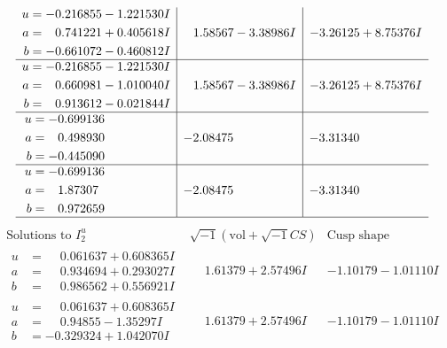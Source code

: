 \documentclass[1p]{elsarticle_modified}
\theoremstyle{definition}
\newcommand{\I}{\sqrt{-1}}
\begin{document}
$$\begin{array}{c|c|c}
\begin{aligned}
u &= -0.216855 - 1.221530 I \\
a &= \phantom{-}0.741221 + 0.405618 I \\
b &= -0.661072 - 0.460812 I\end{aligned}
 & \phantom{-}1.58567 - 3.38986 I & -3.26125 + 8.75376 I \\ \hline\begin{aligned}
u &= -0.216855 - 1.221530 I \\
a &= \phantom{-}0.660981 - 1.010040 I \\
b &= \phantom{-}0.913612 - 0.021844 I\end{aligned}
 & \phantom{-}1.58567 - 3.38986 I & -3.26125 + 8.75376 I \\ \hline\begin{aligned}
u &= -0.699136\phantom{ +0.000000I} \\
a &= \phantom{-}0.498930\phantom{ +0.000000I} \\
b &= -0.445090\phantom{ +0.000000I}\end{aligned}
 & -2.08475\phantom{ +0.000000I} & -3.31340\phantom{ +0.000000I} \\ \hline\begin{aligned}
u &= -0.699136\phantom{ +0.000000I} \\
a &= \phantom{-}1.87307\phantom{ +0.000000I} \\
b &= \phantom{-}0.972659\phantom{ +0.000000I}\end{aligned}
 & -2.08475\phantom{ +0.000000I} & -3.31340\phantom{ +0.000000I}\\
 \hline 
 \end{array}$$\newpage$$\begin{array}{c|c|c}  
\text{Solutions to }I^u_{2}& \I (\text{vol} + \sqrt{-1}CS) & \text{Cusp shape}\\
 \hline 
\begin{aligned}
u &= \phantom{-}0.061637 + 0.608365 I \\
a &= \phantom{-}0.934694 + 0.293027 I \\
b &= \phantom{-}0.986562 + 0.556921 I\end{aligned}
 & \phantom{-}1.61379 + 2.57496 I & -1.10179 - 1.01110 I \\ \hline\begin{aligned}
u &= \phantom{-}0.061637 + 0.608365 I \\
a &= \phantom{-}0.94855 - 1.35297 I \\
b &= -0.329324 + 1.042070 I\end{aligned}
 & \phantom{-}1.61379 + 2.57496 I & -1.10179 - 1.01110 I \\ \hline\begin{aligned}

\end{aligned}
\end{array}$$
\end{document}
